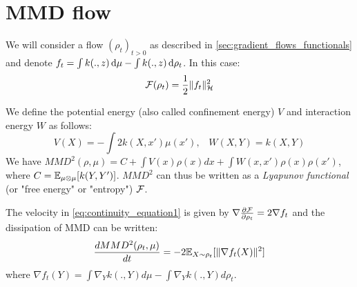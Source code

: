 \section{MMD flow}\label{sec:mmd_flow}



We will consider a flow $(\rho_t)_{t>0}$ as described in \cref{sec:gradient_flows_functionals} and denote $f_t= \int k(.,z)\mathop{}\!\mathrm{d} \mu - \int k(.,z)\mathop{}\!\mathrm{d} \rho_t$. In this case:
\begin{equation}
{{\mathcal F}}(\rho_t)=\frac{1}{2}\|f_t\|^2_{{{\mathcal H}}}
\end{equation} 

We define the potential energy (also called confinement energy) $V$ and interaction energy $W$ as follows:
\begin{equation}
V(X)=-\int 2 k(X,x')\mu(x')\text{,} \quad
W(X,Y)=k(X,Y)
\end{equation}
We have $MMD^2(\rho,\mu)=C+ \int V(x) \rho(x)dx + \int W(x,x')\rho(x)\rho(x')$, where $C={{\mathbb E}}_{\mu\otimes \mu}[k(Y,Y')]$. $MMD^2$ can thus be written as a \textit{Lyapunov functional} (or "free energy" or "entropy") ${{\mathcal F}}$. 


\begin{proposition}\label{prop:mmd_flow}
 The velocity in \eqref{eq:continuity_equation1} is given by $\nabla \frac{\partial{{{\mathcal F}}}}{\partial{\rho_t}}=2 \nabla f_t$ and the dissipation of MMD can be written:  
	\begin{equation}
	\frac{d MMD^2(\rho_t, \mu)}{dt}=-2 {{\mathbb E}}_{X \sim \rho_t}[\|\nabla f_t(X)\|^2]
	\end{equation}
	where $\nabla f_t(Y)= \int \nabla_{Y}k(.,Y) d\mu -  \int \nabla_{Y}k(.,Y) d\rho_t$.
\end{proposition}

